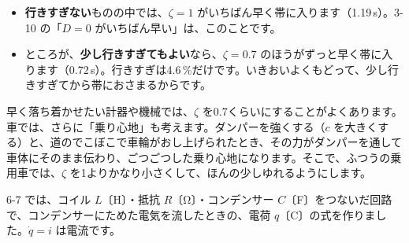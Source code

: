 \begin{itemize}[leftmargin=1.2\zw, itemsep=2pt, topsep=2pt, label={\color{\bkTT}●}]
\item \textbf{行きすぎない}ものの中では、$\zeta=1$ がいちばん早く帯に入ります（1.19\,s）。3-10 の「$D=0$ がいちばん早い」は、このことです。
\item ところが、\textbf{少し行きすぎてもよい}なら、$\zeta=0.7$ のほうがずっと早く帯に入ります（0.72\,s）。行きすぎは4.6\,\%だけです。いきおいよくもどって、少し行きすぎてから帯におさまるからです。
\end{itemize}
早く落ち着かせたい計器や機械では、$\zeta$ を0.7くらいにすることがよくあります。車では、さらに「乗り心地」も考えます。ダンパーを強くする（$c$ を大きくする）と、道のでこぼこで車輪がおし上げられたとき、その力がダンパーを通して車体にそのまま伝わり、ごつごつした乗り心地になります。そこで、ふつうの乗用車では、$\zeta$ を1よりかなり小さくして、ほんの少しゆれるようにします。


\label{bk:6-12:rlc}6-7 では、コイル $L$〔H〕・抵抗 $R$〔Ω〕・コンデンサー $C$〔F〕をつないだ回路で、コンデンサーにためた電気を流したときの、電荷 $q$〔C〕の式を作りました。$\dot q=i$ は電流です。


